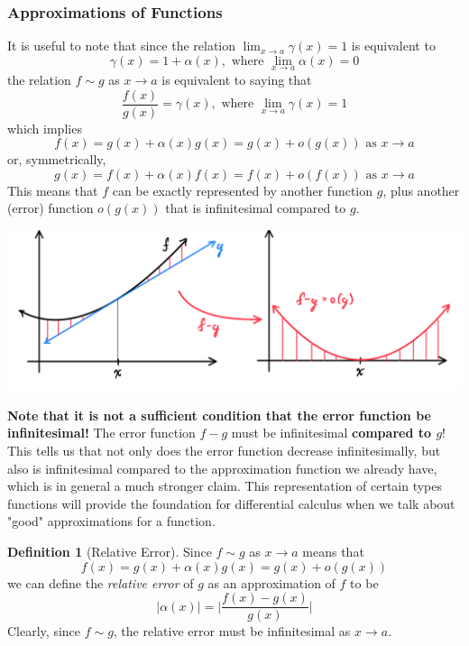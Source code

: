 \documentclass{article}
\theoremstyle{remark}
\theoremstyle{definition}
\newtheorem{definition}{Definition}[section]
\begin{document}
\subsubsection{Approximations of Functions}
It is useful to note that since the relation $\lim_{x \rightarrow a} \gamma(x) = 1$ is equivalent to 
\[\gamma (x) = 1 + \alpha(x), \text{ where } \lim_{x \rightarrow a} \alpha(x) = 0\]
the relation $f \sim g$ as $x\rightarrow a$ is equivalent to saying that
\[\frac{f(x)}{g(x)} = \gamma(x), \text{ where } \lim_{x \rightarrow a} \gamma(x) = 1\]
which implies 
\[f(x) = g(x) + \alpha(x) g(x) = g(x) + o(g(x)) \text{ as } x \rightarrow a\]
or, symmetrically, 
\[g(x) = f(x) + \alpha(x) f(x) = f(x) + o(f(x)) \text{ as } x \rightarrow a\]
This means that $f$ can be exactly represented by another function $g$, plus another (error) function $o(g(x))$ that is infinitesimal compared to $g$. 
\begin{center}
    \includegraphics[scale=0.28]{img/Error_Approximation_of_Function.PNG}
\end{center}
\textbf{Note that it is not a sufficient condition that the error function be infinitesimal!} The error function $f-g$ must be infinitesimal \textbf{compared to $g$}! This tells us that not only does the error function decrease infinitesimally, but also is infinitesimal compared to the approximation function we already have, which is in general a much stronger claim. This representation of certain types functions will provide the foundation for differential calculus when we talk about "good" approximations for a function. 


\begin{definition}[Relative Error]
Since $f \sim g$ as $x \rightarrow a$ means that 
\[f(x) = g(x) + \alpha(x) g(x) = g(x) + o(g(x))\]
we can define the \textit{relative error} of $g$ as an approximation of $f$ to be
\[|\alpha(x)| = \bigg| \frac{f(x) - g(x)}{g(x)} \bigg|\]
Clearly, since $f \sim g$, the relative error must be infinitesimal as $x \rightarrow a$. 
\end{definition}
\end{document}
